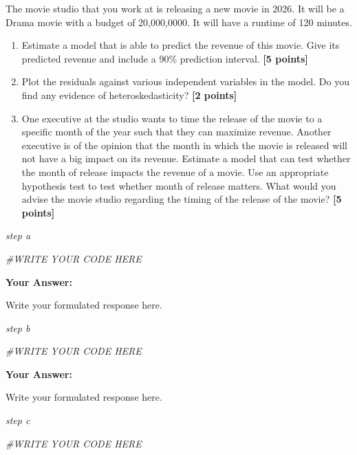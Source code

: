 \documentclass[
]{article}
\newenvironment{Shaded}{\begin{snugshade}}{\end{snugshade}}
\newcommand{\CommentTok}[1]{\textcolor[rgb]{0.56,0.35,0.01}{\textit{#1}}}
\providecommand{\tightlist}{%
  \setlength{\itemsep}{0pt}\setlength{\parskip}{0pt}}
\begin{document}
The movie studio that you work at is releasing a new movie in 2026. It
will be a Drama movie with a budget of 20,000,0000. It will have a
runtime of 120 minutes.

\begin{enumerate}
\def\labelenumi{\alph{enumi}.}
\setcounter{enumi}{3}
\tightlist
\item
  Estimate a model that is able to predict the revenue of this movie.
  Give its predicted revenue and include a 90\% prediction interval.
  \textbf{[5 points]}
\item
  Plot the residuals against various independent variables in the model.
  Do you find any evidence of heteroskedasticity? \textbf{[2 points]}
\item
  One executive at the studio wants to time the release of the movie to
  a specific month of the year such that they can maximize revenue.
  Another executive is of the opinion that the month in which the movie
  is released will not have a big impact on its revenue. Estimate a
  model that can test whether the month of release impacts the revenue
  of a movie. Use an appropriate hypothesis test to test whether month
  of release matters. What would you advise the movie studio regarding
  the timing of the release of the movie? \textbf{[5 points]}
\end{enumerate}

\emph{step a}

\begin{Shaded}
\begin{Highlighting}[]
\CommentTok{\#WRITE YOUR CODE HERE}
\end{Highlighting}
\end{Shaded}

\textbf{Your Answer:}

Write your formulated response here.

\emph{step b}

\begin{Shaded}
\begin{Highlighting}[]
\CommentTok{\#WRITE YOUR CODE HERE}
\end{Highlighting}
\end{Shaded}

\textbf{Your Answer:}

Write your formulated response here.

\emph{step c}

\begin{Shaded}
\begin{Highlighting}[]
\CommentTok{\#WRITE YOUR CODE HERE}
\end{Highlighting}
\end{Shaded}
\end{document}
